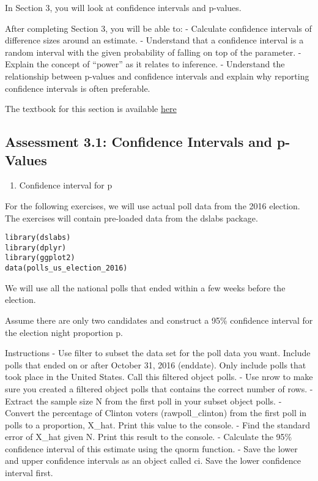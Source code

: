 \documentclass[
]{article}
\providecommand{\tightlist}{%
  \setlength{\itemsep}{0pt}\setlength{\parskip}{0pt}}
\begin{document}
In Section 3, you will look at confidence intervals and p-values.

After completing Section 3, you will be able to: - Calculate confidence
intervals of difference sizes around an estimate. - Understand that a
confidence interval is a random interval with the given probability of
falling on top of the parameter. - Explain the concept of ``power'' as
it relates to inference. - Understand the relationship between p-values
and confidence intervals and explain why reporting confidence intervals
is often preferable.

The textbook for this section is available
\href{https://rafalab.github.io/dsbook/inference.html\#confidence-intervals}{here}

\hypertarget{assessment-3.1-confidence-intervals-and-p-values}{%
\subsection{Assessment 3.1: Confidence Intervals and
p-Values}\label{assessment-3.1-confidence-intervals-and-p-values}}

\begin{enumerate}
\def\labelenumi{\arabic{enumi}.}
\tightlist
\item
  Confidence interval for p
\end{enumerate}

For the following exercises, we will use actual poll data from the 2016
election. The exercises will contain pre-loaded data from the dslabs
package.

\begin{verbatim}
library(dslabs)
library(dplyr)
library(ggplot2)
data(polls_us_election_2016)
\end{verbatim}

We will use all the national polls that ended within a few weeks before
the election.

Assume there are only two candidates and construct a 95\% confidence
interval for the election night proportion p.

Instructions - Use filter to subset the data set for the poll data you
want. Include polls that ended on or after October 31, 2016 (enddate).
Only include polls that took place in the United States. Call this
filtered object polls. - Use nrow to make sure you created a filtered
object polls that contains the correct number of rows. - Extract the
sample size N from the first poll in your subset object polls. - Convert
the percentage of Clinton voters (rawpoll\_clinton) from the first poll
in polls to a proportion, X\_hat. Print this value to the console. -
Find the standard error of X\_hat given N. Print this result to the
console. - Calculate the 95\% confidence interval of this estimate using
the qnorm function. - Save the lower and upper confidence intervals as
an object called ci. Save the lower confidence interval first.
\end{document}

